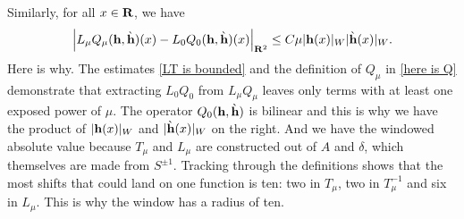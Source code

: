 \documentclass[12pt]{amsart}
\numberwithin{equation}{section}
\newcommand{\be}{\begin{equation}}
\newcommand{\ee}{\end{equation}}
\newcommand{\R}{{\bf{R}}}
\newcommand{\hb}{{\bf{h}}}
\newcommand{\hbg}{{\grave{\bf{h}}}}
\begin{document}
Similarly, for all $x \in \R$, we have
\be\label{LQ err}
\left | L_\mu Q_\mu(\hb,\hbg)(x)-L_0 Q_0(\hb,\hbg)(x) \right|_{\R^2} \le C\mu | \hb (x)|_W |\hbg(x)|_W.
\ee
Here is why. The estimates \eqref{LT is bounded}
and the definition of $Q_\mu$ in \eqref{here is Q}  demonstrate
that extracting $L_0 Q_0$ from $L_\mu Q_\mu$ leaves only terms with at least one
exposed power of $\mu$. The operator $Q_0(\hb,\hbg)$ is bilinear and this is why we have
the product of $| \hb (x)|_W$ and $|\hbg(x)|_W$ on the right. And we have the windowed absolute
value because $T_\mu$ and $L_\mu$ are constructed out of $A$ and $\delta$, which themselves
are made from $S^{\pm 1}$. Tracking through the definitions shows that the most shifts that could land
on one function is ten: two in $T_\mu$, two in $T_\mu^{-1}$ and six in $L_\mu$. This is why the window has a
radius of ten.
\end{document}
